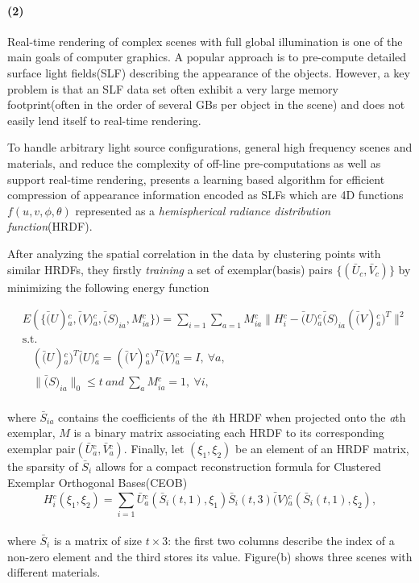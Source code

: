 \paragraph{(2)}
Real-time rendering of complex scenes with full global illumination is one of the main goals of computer graphics.
A popular approach is to pre-compute detailed surface light fields(SLF) describing the appearance of the objects.
However, a key problem is that an SLF data set often exhibit a very large memory footprint(often in the order of several GBs per object in the scene) and does not easily lend itself to real-time rendering.

To handle arbitrary light source configurations, general high frequency scenes and materials,
and reduce the complexity of off-line pre-computations as well as support real-time rendering,
\cite{miandji2013learning} presents a learning based algorithm for efficient compression of appearance information encoded as SLFs
which are 4D functions$f(u,v,\phi,\theta)$ represented as a \textit{hemispherical radiance distribution function}(HRDF).

After analyzing the spatial correlation in the data by clustering points with similar HRDFs,
they firstly \textit{training} a set of exemplar(basis) pairs $\{(\bar{U}_{c},\bar{V}_c)\}$ by minimizing the following energy function

\small{
\begin{equation}
 \label{eq:L1reconstruction}
 \begin{aligned}
 & E(\{\bar(U){_{a}^{c}}, \bar(V){_{a}^{c}}, \bar(S)_{ia}, M{_{ia}^{c}}\})=
   \sum_{i=1}^{} \sum_{a=1}^{}
   M{_{ia}^{c}}
   \| H{_{i}^{c}} - \bar(U){_{a}^{c}} \bar(S)_{ia} (\bar(V){_{a}^{c}})^{T}\|^2 \\
 &\mathrm{s.t.} \\
 &~~~~  (\bar(U){_{a}^{c}})^{T} \bar(U){_{a}^{c}} = (\bar(V){_{a}^{c}})^{T} \bar(V){_{a}^{c}} = I,~\forall a,\\
 &~~~~  \| \bar(S)_{ia} \|_0 \le t ~and~ \sum_{a}^{} M{_{ia}^{c}}=1,~\forall i,
 \end{aligned}
\end{equation}
}
\\
where $\bar{S}_{ia}$ contains the coefficients of the \textit{i}th HRDF when projected onto the \textit{a}th exemplar, $M$ is a binary matrix associating each HRDF to its corresponding exemplar pair$(\bar{U}{_{a}^{c}},\bar{V}{_{a}^{c}})$. Finally, let $(\xi_1, \xi_2)$ be an element of an HRDF matrix, the sparsity of $\bar{S}_i$ allows for a compact reconstruction formula for Clustered Exemplar Orthogonal Bases(CEOB)
\small{
\begin{equation}
 \label{eq:L1reconstruction}
 H{_{i}^{c}}(\xi_1, \xi_2) = \sum_{i=1}^{} \bar{U}{_{a}^{c}}(\bar{S}_{i}(t,1), \xi_1) \bar{S}_{i}(t,3) \bar(V){_{a}^{c}}(\bar{S}_{i}(t,1), \xi_2),
\end{equation}
}
\\
where $\bar{S}_{i}$ is a matrix of size $t\times3$: the first two columns describe the index of a non-zero element and the third stores its value.
Figure(b) shows three scenes with different materials.

